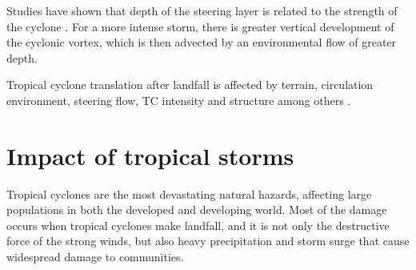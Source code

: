 
Studies have shown that depth of the steering layer is related to the strength of the cyclone \citep{velden1991basic}. For a more intense storm, there is greater vertical development of the cyclonic vortex, which is then advected by an environmental flow of greater depth. 

Tropical cyclone translation after landfall is affected by terrain, circulation environment, steering flow, TC intensity and structure among others \citep{xiao2013analysis}.






\section{Impact of tropical storms}

Tropical cyclones are the most devastating natural hazards, affecting large populations in both the developed and developing world. Most of the damage occurs when tropical cyclones make landfall, and it is not only the destructive force of the strong winds, but also heavy precipitation and storm surge that cause widespread damage to communities.

